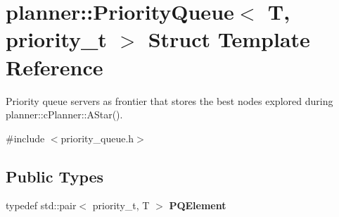 \hypertarget{structplanner_1_1_priority_queue}{}\section{planner\+:\+:Priority\+Queue$<$ T, priority\+\_\+t $>$ Struct Template Reference}
\label{structplanner_1_1_priority_queue}


Priority queue servers as frontier that stores the best nodes explored during planner\+::c\+Planner\+::\+A\+Star().  




{\ttfamily \#include $<$priority\+\_\+queue.\+h$>$}

\subsection*{Public Types}
\begin{DoxyCompactItemize}
\item 
\mbox{\label{structplanner_1_1_priority_queue_ae0445a3c85c4e139fcf28479a800f019}} 
typedef std\+::pair$<$ priority\+\_\+t, T $>$ {\bfseries P\+Q\+Element}
\end{DoxyCompactItemize}
